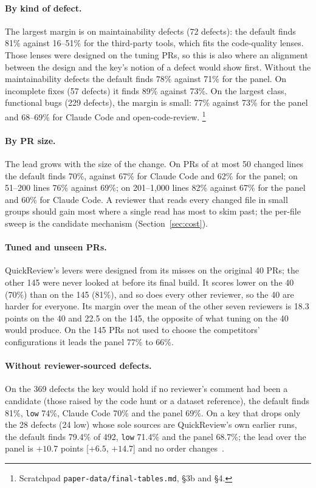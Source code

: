 \documentclass[11pt,a4paper]{article}
\newcommand{\qcr}{QuickReview}
\newcommand{\code}[1]{\texttt{#1}}
\begin{document}
\paragraph{By kind of defect.} The largest margin is on maintainability
defects (72 defects): the default finds 81\% against 16--51\% for the
third-party tools, which fits the code-quality lenses. Those lenses were
designed on the tuning PRs, so this is also where an alignment between the
design and the key's notion of a defect would show first. Without the
maintainability defects the default finds 78\% against 71\% for the panel.
On incomplete fixes (57 defects) it finds 89\% against 73\%. On the largest
class, functional bugs (229 defects), the margin is small: 77\% against
73\% for the panel and 68--69\% for Claude Code and open-code-review.
\footnote{Scratchpad \code{paper-data/final-tables.md}, \S3b and \S4.}

\paragraph{By PR size.} The lead grows with the size of the change. On PRs
of at most 50 changed lines the default finds 70\%, against 67\% for Claude
Code and 62\% for the panel; on 51--200 lines 76\% against 69\%; on
201--1{,}000 lines 82\% against 67\% for the panel and 60\% for Claude
Code. A reviewer that reads every changed file in small groups should gain
most where a single read has most to skim past; the per-file sweep is the
candidate mechanism (Section~\ref{sec:cost}).

\paragraph{Tuned and unseen PRs.} \qcr{}'s levers were designed from its
misses on the original 40 PRs; the other 145 were never looked at before its
final build. It scores lower on the 40 (70\%) than on the 145 (81\%), and so
does every other reviewer, so the 40 are harder for everyone. Its margin over
the mean of the other seven reviewers is 18.3 points on the 40 and 22.5 on
the 145, the opposite of what tuning on the 40 would produce. On the 145
PRs not used to choose the competitors' configurations it leads the panel
77\% to 66\%.

\paragraph{Without reviewer-sourced defects.} On the 369 defects the key
would hold if no reviewer's comment had been a candidate (those raised by
the code hunt or a dataset reference), the default finds 81\%, \code{low}
74\%, Claude Code 70\% and the panel 69\%. On a key that drops only the 28
defects (24 low) whose sole sources are \qcr{}'s own earlier runs, the
default finds 79.4\% of 492, \code{low} 71.4\% and the panel 68.7\%; the
lead over the panel is $+10.7$ points [$+6.5$, $+14.7$] and no order
changes~\cite{qcrbench}.
\end{document}
